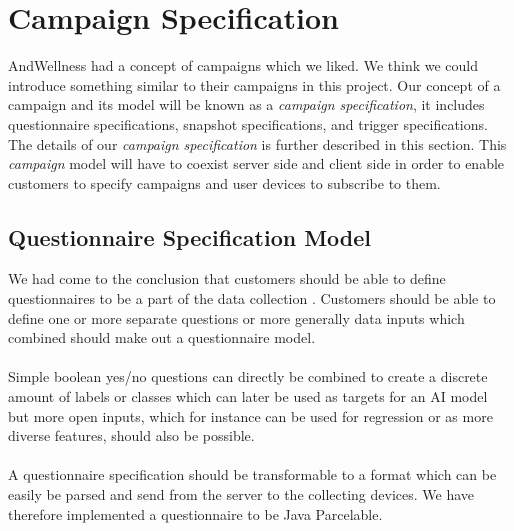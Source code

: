 
\section{Campaign Specification}
\label{sec:campaign_specification}
AndWellness had a concept of campaigns  which we liked. We think we could introduce something similar to their campaigns in this project. Our concept of a campaign and its model will be known as a \textit{campaign specification}, it includes questionnaire specifications, snapshot specifications, and trigger specifications. The details of our \textit{campaign specification} is further described in this section. This \textit{campaign} model will have to coexist server side and client side in order to enable customers to specify campaigns and user devices to subscribe to them.  

\subsection{Questionnaire Specification Model}
\label{sub:questionnaire_model}
We had come to the conclusion that customers should be able to define questionnaires to be a part of the data collection . Customers should be able to define one or more separate questions or more generally data inputs which combined should make out a questionnaire model. 
\\\\
Simple boolean yes/no questions can directly be combined to create a discrete amount of labels or classes which can later be used as targets for an AI model but more open inputs, which for instance can be used for regression or as more diverse features, should also be possible. 
\\\\
A questionnaire specification should be transformable to a format which can be easily be parsed and send from the server to the collecting devices. We have therefore implemented a questionnaire to be Java Parcelable. 

